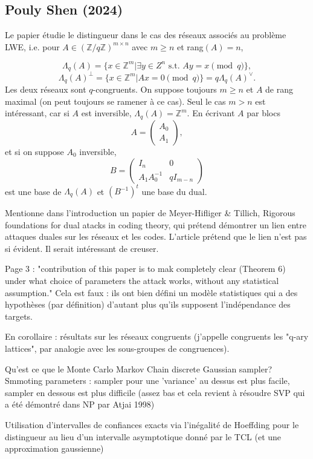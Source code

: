 \documentclass{article}
\begin{document}
\subsection{Pouly Shen (2024)}

Le papier étudie le distingueur dans le cas des réseaux associés au problème LWE, i.e. pour $A\in (\mathbb Z /q\mathbb Z )^{m\times n}$ avec $m\geq n$ et rang$(A)=n$,

$$\Lambda_q(A) = \{x\in \mathbb Z^m | \exists y \in Z^n \text{ s.t. }Ay = x \pmod q \} ,$$
$$\Lambda_q(A)^\perp = \{x\in \mathbb Z^m | Ax = 0 \pmod q \} = q \Lambda_q(A)^\vee.$$
Les deux réseaux sont $q$-congruents. On suppose toujours $m\geq n$ et $A$ de rang maximal (on peut toujours se ramener à ce cas). Seul le cas $m>n$ est intéressant, car si $A$ est inversible, $\Lambda_q(A) = \mathbb Z^m$. En écrivant $A$ par blocs 
$$A =\begin{pmatrix} A_0 \\ A_1\end{pmatrix},$$
et si on suppose $A_0$ inversible, 
$$B=\begin{pmatrix} I_n & 0 \\ A_1A_0^{-1} & qI_{m-n}\end{pmatrix} $$
est une base de $\Lambda_q(A)$ et $(B^{-1})^t$ une base du dual.

Mentionne dans l'introduction un papier de Meyer-Hifliger \& Tillich, Rigorous foundations for dual atacks in coding theory, qui prétend démontrer un lien entre attaques duales sur les réseaux et les codes. L'article prétend que le lien n'est pas si évident. Il serait intéressant de creuser.

Page 3 : "contribution of this paper is to mak completely clear (Theorem 6) under what choice of parameters the attack works, without any statistical assumption." Cela est faux : ils ont bien défini un modèle statistiques qui a des hypothèses (par définition) d'autant plus qu'ils supposent l'indépendance des targets.

En corollaire : résultats sur les réseaux congruents (j'appelle congruents les "q-ary lattices", par analogie avec les sous-groupes de congruences).

Qu'est ce que le Monte Carlo Markov Chain discrete Gaussian sampler? Smmoting parameters : sampler pour une 'variance' au dessus est plus facile, sampler en dessous est plus difficile (assez bas et cela revient à résoudre SVP qui a été démontré dans NP par Atjai 1998)

Utilisation d'intervalles de confiances exacts via l'inégalité de Hoeffding pour le distingueur au lieu d'un intervalle asymptotique donné par le TCL (et une approximation gaussienne)
\end{document}

